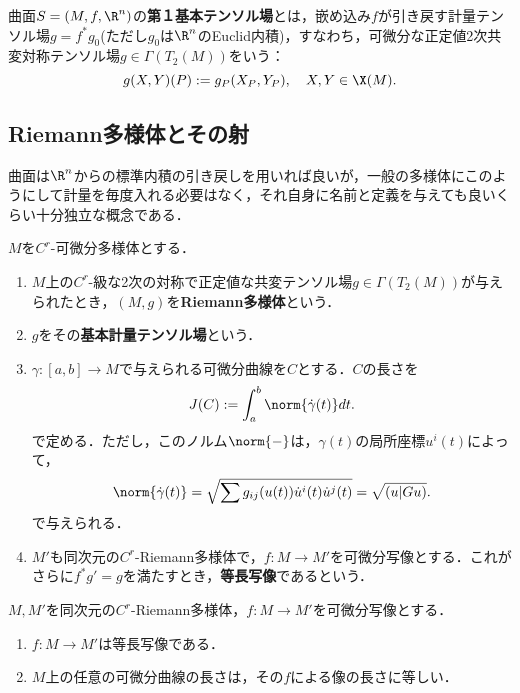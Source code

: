 \documentclass[uplatex,dvipdfmx]{jsreport}
\begin{document}
\begin{definition}
    曲面$S=(M,f,\R^n)$の\textbf{第１基本テンソル場}とは，嵌め込み$f$が引き戻す計量テンソル場$g=f^*g_0$(ただし$g_0$は$\R^n$のEuclid内積)，すなわち，可微分な正定値2次共変対称テンソル場$g\in \Gamma(T_2(M))$をいう：
    \[g(X,Y)(P):=g_P(X_P,Y_P),\quad X,Y\in \X(M).\]
\end{definition}

\subsection{Riemann多様体とその射}

\begin{tcolorbox}[colframe=ForestGreen, colback=ForestGreen!10!white,breakable,colbacktitle=ForestGreen!40!white,coltitle=black,fonttitle=\bfseries\sffamily,
title=]
    曲面は$\R^n$からの標準内積の引き戻しを用いれば良いが，一般の多様体にこのようにして計量を毎度入れる必要はなく，それ自身に名前と定義を与えても良いくらい十分独立な概念である．
\end{tcolorbox}

\begin{definition}
    $M$を$C^r$-可微分多様体とする．
    \begin{enumerate}
        \item $M$上の$C^r$-級な2次の対称で正定値な共変テンソル場$g\in \Gamma(T_2(M))$が与えられたとき，$(M,g)$を\textbf{Riemann多様体}という．
        \item $g$をその\textbf{基本計量テンソル場}という．
        \item $\gamma:[a,b]\to M$で与えられる可微分曲線を$C$とする．$C$の長さを
        \[J(C):=\int^b_a\norm{\dot{\gamma}(t)}dt.\]
        で定める．ただし，このノルム$\norm{-}$は，$\gamma(t)$の局所座標$u^i(t)$によって，
        \[\norm{\dot{\gamma}(t)}=\sqrt{\sum g_{ij}(u(t))\dot{u}^i(t)\dot{u}^j(t)}=\sqrt{(u|Gu)}.\]
        で与えられる．
        \item $M'$も同次元の$C^r$-Riemann多様体で，$f:M\to M'$を可微分写像とする．これがさらに$f^*g'=g$を満たすとき，\textbf{等長写像}であるという．
    \end{enumerate}
\end{definition}

\begin{lemma}
    $M,M'$を同次元の$C^r$-Riemann多様体，$f:M\to M'$を可微分写像とする．
    \begin{enumerate}
        \item $f:M\to M'$は等長写像である．
        \item $M$上の任意の可微分曲線の長さは，その$f$による像の長さに等しい．
    \end{enumerate}
\end{lemma}
\end{document}
